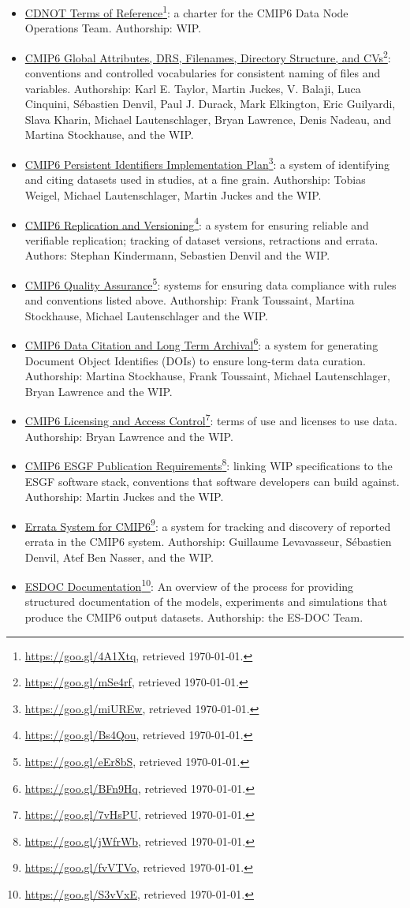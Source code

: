 \documentclass[gmd,manuscript]{copernicus}
\newcommand{\urlref}[2] {\href{#1}{#2}\footnote{\url{#1}, retrieved \today.}}
\begin{document}
\begin{itemize}
\item \urlref{https://goo.gl/4A1Xtq}{CDNOT Terms of Reference}: a
  charter for the CMIP6 Data Node Operations Team. Authorship: WIP.
\item \urlref{https://goo.gl/mSe4rf}{CMIP6 Global Attributes, DRS,
    Filenames, Directory Structure, and CVs}: conventions and
  controlled vocabularies for consistent naming of files and
  variables. Authorship: Karl E. Taylor, Martin Juckes, V. Balaji,
  Luca Cinquini, Sébastien Denvil, Paul J. Durack, Mark Elkington,
  Eric Guilyardi, Slava Kharin, Michael Lautenschlager, Bryan
  Lawrence, Denis Nadeau, and Martina Stockhause, and the WIP.
\item \urlref{https://goo.gl/miUREw}{CMIP6 Persistent Identifiers
    Implementation Plan}: a system of identifying and citing datasets
  used in studies, at a fine grain. Authorship: Tobias Weigel, Michael
  Lautenschlager, Martin Juckes and the WIP.
\item \urlref{https://goo.gl/Bs4Qou}{CMIP6 Replication and Versioning}:
  a system for ensuring reliable and verifiable replication; tracking
  of dataset versions, retractions and errata. Authors: Stephan
  Kindermann, Sebastien Denvil and the WIP.
\item \urlref{https://goo.gl/eEr8bS}{CMIP6 Quality Assurance}: systems
  for ensuring data compliance with rules and conventions listed
  above. Authorship: Frank Toussaint, Martina Stockhause, Michael
  Lautenschlager and the WIP.
\item \urlref{https://goo.gl/BFn9Hq}{CMIP6 Data Citation and Long Term
    Archival}: a system for generating Document Object Identifies
  (DOIs) to ensure long-term data curation. Authorship: Martina
  Stockhause, Frank Toussaint, Michael Lautenschlager, Bryan Lawrence
  and the WIP.
\item \urlref{https://goo.gl/7vHsPU}{CMIP6 Licensing and Access
    Control}: terms of use and licenses to use data. Authorship: Bryan
  Lawrence and the WIP.
\item \urlref{https://goo.gl/jWfrWb}{CMIP6 ESGF Publication
    Requirements}: linking WIP specifications to the ESGF software
  stack, conventions that software developers can build against.
  Authorship: Martin Juckes and the WIP.
\item \urlref{https://goo.gl/fvVTVo}{Errata System for CMIP6}: a system
  for tracking and discovery of reported errata in the CMIP6 system.
  Authorship: Guillaume Levavasseur, Sébastien Denvil, Atef Ben
  Nasser, and the WIP.
\item \urlref{https://goo.gl/S3vVxE}{ESDOC Documentation}: An overview
  of the process for providing structured documentation of the models,
  experiments and simulations that produce the CMIP6 output datasets.
  Authorship: the ES-DOC Team.
\end{itemize}
\end{document}
